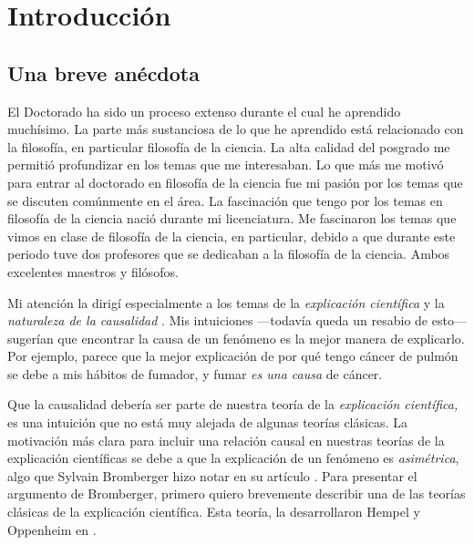 
\chapter*{Introducción}\label{ch:introduction}

\section{Una breve anécdota}

\noindent El Doctorado ha sido un proceso extenso durante el cual he
aprendido muchísimo. La parte más sustanciosa de lo que he aprendido
está relacionado con la filosofía, en particular filosofía de la
ciencia. La alta calidad del posgrado me permitió profundizar en los
temas que me interesaban. Lo que más me motivó para entrar al
doctorado en filosofía de la ciencia fue mi pasión por los temas que
se discuten comúnmente en el área. La fascinación que tengo por los
temas en filosofía de la ciencia nació durante mi licenciatura. Me
fascinaron los temas que vimos en clase de filosofía de la ciencia,
en particular, debido a que durante este periodo tuve dos profesores
que se dedicaban a la filosofía de la ciencia. Ambos excelentes maestros y filósofos.

Mi atención la dirigí especialmente a los temas de la \emph
{explicación científica} y la \emph{naturaleza de la causalidad
}. Mis intuiciones ---todavía queda un resabio de esto--- sugerían
que encontrar la causa de un fenómeno es la mejor manera de
explicarlo. Por ejemplo, parece que la mejor explicación de por qué
tengo cáncer de pulmón se debe a mis hábitos de fumador, y fumar \emph
{es una causa} de cáncer.

Que la causalidad debería ser parte de nuestra teoría de la
\emph{explicación científica,} es una intuición que no está muy
alejada de algunas teorías clásicas. La motivación más clara para
incluir una relación causal en nuestras teorías de la explicación
científicas se debe a que la explicación de un fenómeno es \emph
{asimétrica}, algo que Sylvain Bromberger hizo notar en su artículo
. Para presentar el argumento de
Bromberger, primero quiero brevemente describir una de las teorías clásicas de
la explicación científica. Esta teoría, la desarrollaron Hempel y Oppenheim en .

